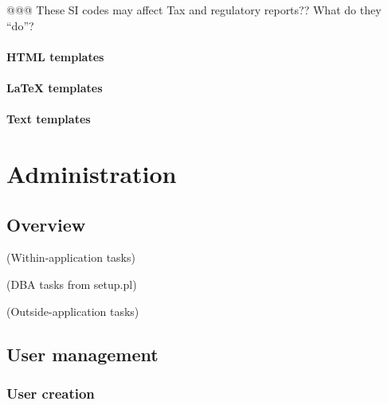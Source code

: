 \documentclass[10pt,A4]{book}
\begin{document}
@@@ These SI codes may affect Tax and regulatory reports?? What do they ``do''?

\subsection{HTML templates}

\subsection{LaTeX templates}

\subsection{Text templates}



\part{Administration}
\label{part:Administration}

%

\chapter{Overview}


(Within-application tasks)

(DBA tasks from setup.pl)

(Outside-application tasks)

\chapter{User management}

\section{User creation}
\end{document}
